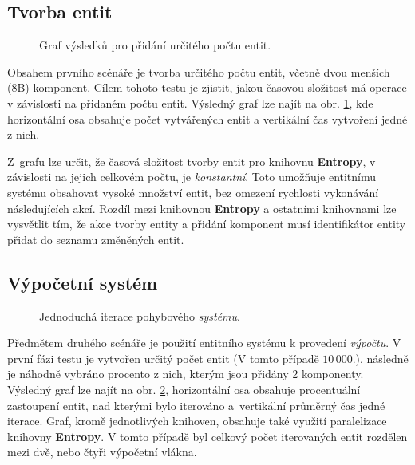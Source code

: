\subsection{Tvorba entit}

\begin{figure}[H]
	\begin{center}
	\end{center}
	\caption{Graf výsledků pro přidání určitého počtu entit.}
	\label{Fig:EVALEntity}
\end{figure}

Obsahem prvního scénáře je tvorba určitého počtu entit, včetně dvou menších (8B) komponent. Cílem tohoto testu je zjistit, jakou časovou složitost má operace v závislosti na přidaném počtu entit. Výsledný graf lze najít na obr. \ref{Fig:EVALEntity}, kde horizontální osa obsahuje počet vytvářených entit a vertikální čas vytvoření jedné z nich. 

Z~grafu lze určit, že časová složitost tvorby entit pro knihovnu \textbf{Entropy}, v závislosti na jejich celkovém počtu, je \emph{konstantní}. Toto umožňuje entitnímu systému obsahovat vysoké množství entit, bez omezení rychlosti vykonávání následujících akcí. Rozdíl mezi knihovnou \textbf{Entropy} a ostatními knihovnami lze vysvětlit tím, že akce tvorby entity a přidání komponent musí identifikátor entity přidat do seznamu změněných entit.

\subsection{Výpočetní systém}

\begin{figure}[H]
	\begin{center}
	\end{center}
	\caption{Jednoduchá iterace pohybového \emph{systému}.}
	\label{Fig:EVALMovSys}
\end{figure}

Předmětem druhého scénáře je použití entitního systému k provedení \emph{výpočtu}. V první fázi testu je vytvořen určitý počet entit (V tomto případě $10\,000$.), následně je náhodně vybráno procento z nich, kterým jsou přidány 2 komponenty. Výsledný graf lze najít na obr. \ref{Fig:EVALMovSys}, horizontální osa obsahuje procentuální zastoupení entit, nad kterými bylo iterováno a~vertikální průměrný čas jedné iterace. Graf, kromě jednotlivých knihoven, obsahuje také využití paralelizace knihovny \textbf{Entropy}. V tomto případě byl celkový počet iterovaných entit rozdělen mezi dvě, nebo čtyři výpočetní vlákna. 

